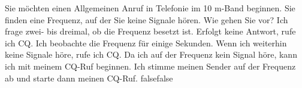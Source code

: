     {Sie möchten einen Allgemeinen Anruf in Telefonie im 10 m-Band beginnen. Sie finden eine Frequenz, auf der Sie keine Signale hören. Wie gehen Sie vor?}
    {Ich frage zwei- bis dreimal, ob die Frequenz besetzt ist. Erfolgt keine Antwort, rufe ich CQ.}
    {Ich beobachte die Frequenz für einige Sekunden. Wenn ich weiterhin keine Signale höre, rufe ich CQ.}
    {Da ich auf der Frequenz kein Signal höre, kann ich mit meinem CQ-Ruf beginnen.}
    {Ich stimme meinen Sender auf der Frequenz ab und starte dann meinen CQ-Ruf.}
    {false}{false}